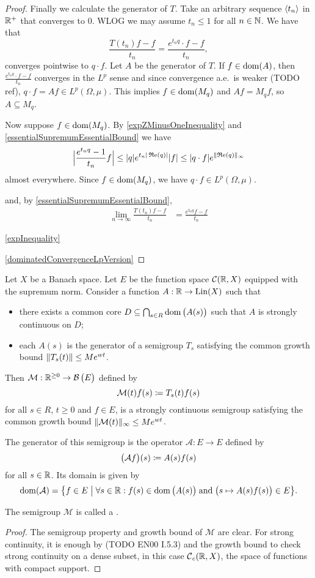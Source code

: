 \begin{proof}
Finally we calculate the generator of $T$. Take an arbitrary  sequence $\left\langle t_n \right\rangle$ in $\mathbb{R}^+$ that converges to $0$. WLOG we may assume $t_n \leq 1$ for all $n\in\mathbb{N}$. We have that
\[ \frac{T(t_n)f - f}{t_n} = \frac{e^{t_nq}\cdot f - f}{t_n}, \]
converges pointwise to $q\cdot f$. Let $A$ be the generator of $T$. If $f\in \operatorname{dom}(A)$, then $\frac{e^{t_nq}\cdot f - f}{t_n}$ converges in the $L^p$ sense and since convergence a.e.\ is weaker (TODO ref), $q\cdot f = Af \in L^p(\Omega,\mu)$. This implies $f\in \operatorname{dom}(M_q)$ and $Af = M_qf$, so $A\subseteq M_q$.

Now suppose $f\in \operatorname{dom}(M_q)$.
By \ref{expZMinusOneInequality} and \ref{essentialSupremumEssentialBound} we have
\[ \Big|\frac{e^{t_nq} - 1}{t_n}f\Big| \leq |q| e^{t_n |\operatorname{\mathfrak{R}e}(q)|}|f| \leq |q\cdot f|e^{\lVert\operatorname{\mathfrak{R}e}(q)\rVert_\infty} \]
almost everywhere. Since $f\in \operatorname{dom}(M_q)$, we have $q\cdot f\in L^p(\Omega,\mu)$.




and, by \ref{essentialSupremumEssentialBound},
\begin{align*}
\lim_{n\to \infty} \frac{T(t_n)f - f}{t_n} &= \frac{e^{t_nq}f - f}{t_n}
\end{align*}



\ref{expInequality}

\ref{dominatedConvergenceLpVersion}
\end{proof}




\begin{proposition}
Let $X$ be a Banach space. Let $E$ be the function space $\operatorname{\mathcal{C}}(\mathbb{R},X)$ equipped with the supremum norm. Consider a function $A: \mathbb{R}\to \operatorname{Lin}(X)$ such that
\begin{itemize}
\item there exists a common core $D\subseteq \bigcap_{s\in R}\operatorname{dom}\big(A(s)\big)$ such that $A$ is strongly continuous on $D$;
\item each $A(s)$ is the generator of a semigroup $T_s$ satisfying the common growth bound $\lVert T_s(t)\rVert\leq Me^{wt}$.
\end{itemize}
Then $\mathcal{M}: \mathbb{R}^{\geq 0}\to \operatorname{\mathcal{B}}\big(E\big)$ defined by
\[ \mathcal{M}(t)f(s) \coloneqq T_s(t)f(s) \]
for all $s\in R$, $t\geq 0$ and $f\in E$, is a strongly continuous semigroup satisfying the common growth bound $\lVert\mathcal{M}(t)\rVert_{\infty} \leq Me^{wt}$.

The generator of this semigroup is the operator $\mathcal{A}:E\to E$ defined by
\[ \big(\mathcal{A}f\big)(s) \coloneqq A(s)f(s) \]
for all $s\in \mathbb{R}$. Its domain is given by
\[ \dom(\mathcal{A}) = \setbuilder{f\in E}{\forall s\in \R: f(s)\in \dom\big(A(s)\big)\;\text{and}\; \big(s\mapsto A(s)f(s)\big)\in E}. \]
\end{proposition}
The semigroup $\mathcal{M}$ is called a .
\begin{proof}
The semigroup property and growth bound of $\mathcal{M}$ are clear. For strong continuity, it is enough by (TODO EN00 I.5.3) and the growth bound to check strong continuity on a dense subset, in this case $\operatorname{\mathcal{C}}_c(\mathbb{R},X)$, the space of functions with compact support.
\end{proof}

